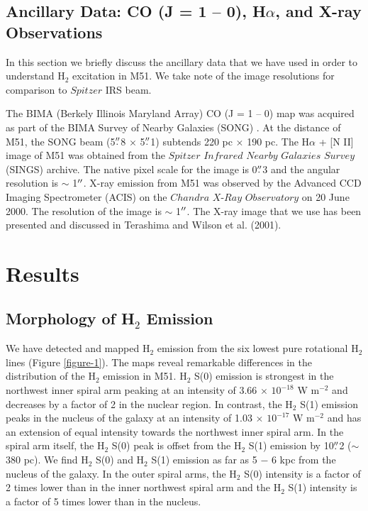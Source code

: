 \documentclass[manuscript]{aastex}
\begin{document}
\subsection{Ancillary Data: CO (J = 1 -- 0), H$\alpha$, and X-ray Observations}

In this section we briefly discuss the ancillary data that we 
have used in order to understand H$_2$ excitation in M51.  
We take note of the image resolutions for comparison to 
$Spitzer$ IRS beam.  

The BIMA (Berkely Illinois Maryland Array) CO (J = 1 -- 0) map was
acquired as part of the BIMA Survey of Nearby Galaxies (SONG)
\citep{reg01, hel03}.  At the distance of M51, the SONG beam
(5$\mbox{$.\!\!^{\prime\prime}$}$8 $\times$ 5$\mbox{$.\!\!^{\prime\prime}$}$1) subtends 220 pc $\times$ 190 pc.  
The H$\alpha$ + [N II] image of M51 was obtained from the
$Spitzer$ $Infrared$ $Nearby$ $Galaxies$ $Survey$ (SINGS) 
archive.  The native pixel scale for the image is 0$\mbox{$.\!\!^{\prime\prime}$}$3 
and the angular resolution is $\sim$ 1$\mbox{$^{\prime\prime}$}$.  X-ray 
emission from M51 was observed by the Advanced CCD 
Imaging Spectrometer (ACIS) on the $Chandra$ $X$-$Ray$ 
$Observatory$ on 20 June 2000.  The resolution of 
the image is $\sim$ 1$\mbox{$^{\prime\prime}$}$.  The X-ray image that 
we use has been presented and discussed in 
Terashima and Wilson et al. (2001).

\section{Results}

\subsection{Morphology of H$_2$ Emission}

We have detected and mapped $\mathrm{H_2}$ emission from the six
lowest pure rotational $\mathrm{H_2}$ lines (Figure \ref{figure-1}).  The
maps reveal remarkable differences in the distribution of the
$\mathrm{H_2}$ emission in M51.  $\mathrm{H_2}$ S(0) emission is
strongest in the northwest inner spiral arm peaking at an intensity of 3.66
$\times$ $\mathrm{10^{-18}}$ W $\mathrm{m^{-2}}$ and decreases by a
factor of 2 in the nuclear region.  In contrast, the $\mathrm{H_2}$
S(1) emission peaks in the nucleus of the galaxy at an intensity of
1.03 $\times$ $\mathrm{10^{-17}}$ W $\mathrm{m^{-2}}$ and has an
extension of equal intensity towards the northwest inner spiral arm.  In the
spiral arm itself, the $\mathrm{H_2}$ S(0) peak is offset from the
$\mathrm{H_2}$ S(1) emission by 10$\mbox{$.\!\!^{\prime\prime}$}$2 ($\sim$ 380 pc).  
We find $\mathrm{H_2}$ S(0) and $\mathrm{H_2}$ S(1) emission as far as 5
$-$ 6 kpc from the nucleus of the galaxy.  In the outer spiral arms,
the $\mathrm{H_2}$ S(0) intensity is a factor of 2 times lower than in
the inner northwest spiral arm and the $\mathrm{H_2}$ S(1) intensity
is a factor of 5 times lower than in the nucleus.
 
\end{document}
